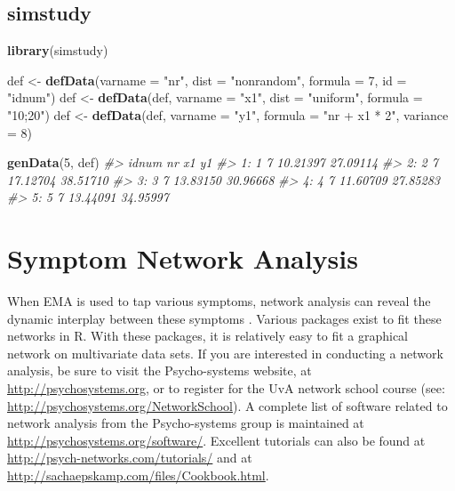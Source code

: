 \documentclass[]{book}
\newenvironment{Shaded}{\begin{snugshade}}{\end{snugshade}}
\newcommand{\KeywordTok}[1]{\textcolor[rgb]{0.13,0.29,0.53}{\textbf{#1}}}
\newcommand{\DataTypeTok}[1]{\textcolor[rgb]{0.13,0.29,0.53}{#1}}
\newcommand{\DecValTok}[1]{\textcolor[rgb]{0.00,0.00,0.81}{#1}}
\newcommand{\StringTok}[1]{\textcolor[rgb]{0.31,0.60,0.02}{#1}}
\newcommand{\CommentTok}[1]{\textcolor[rgb]{0.56,0.35,0.01}{\textit{#1}}}
\newcommand{\NormalTok}[1]{#1}
\begin{document}
\subsection{simstudy}\label{simstudy}

\begin{Shaded}
\begin{Highlighting}[]
\KeywordTok{library}\NormalTok{(simstudy)}

\NormalTok{def <-}\StringTok{ }\KeywordTok{defData}\NormalTok{(}\DataTypeTok{varname =} \StringTok{"nr"}\NormalTok{, }\DataTypeTok{dist =} \StringTok{"nonrandom"}\NormalTok{, }\DataTypeTok{formula =} \DecValTok{7}\NormalTok{, }\DataTypeTok{id =} \StringTok{"idnum"}\NormalTok{)}
\NormalTok{def <-}\StringTok{ }\KeywordTok{defData}\NormalTok{(def, }\DataTypeTok{varname =} \StringTok{"x1"}\NormalTok{, }\DataTypeTok{dist =} \StringTok{"uniform"}\NormalTok{, }\DataTypeTok{formula =} \StringTok{"10;20"}\NormalTok{)}
\NormalTok{def <-}\StringTok{ }\KeywordTok{defData}\NormalTok{(def, }\DataTypeTok{varname =} \StringTok{"y1"}\NormalTok{, }\DataTypeTok{formula =} \StringTok{"nr + x1 * 2"}\NormalTok{, }\DataTypeTok{variance =} \DecValTok{8}\NormalTok{)}

\KeywordTok{genData}\NormalTok{(}\DecValTok{5}\NormalTok{, def)}
\CommentTok{#>    idnum nr       x1       y1}
\CommentTok{#> 1:     1  7 10.21397 27.09114}
\CommentTok{#> 2:     2  7 17.12704 38.51710}
\CommentTok{#> 3:     3  7 13.83150 30.96668}
\CommentTok{#> 4:     4  7 11.60709 27.85283}
\CommentTok{#> 5:     5  7 13.44091 34.95997}
\end{Highlighting}
\end{Shaded}

\section{Symptom Network Analysis}\label{symptom-network-analysis}

 

When EMA is used to tap various symptoms, network analysis can reveal
the dynamic interplay between these symptoms
\citep{Borsboom2013, Borsboom2017, Bringmann2015}. Various packages
exist to fit these networks in R. With these packages, it is relatively
easy to fit a graphical network on multivariate data sets. If you are
interested in conducting a network analysis, be sure to visit the
Psycho-systems website, at \url{http://psychosystems.org}, or to
register for the UvA network school course (see:
\url{http://psychosystems.org/NetworkSchool}). A complete list of
software related to network analysis from the Psycho-systems group is
maintained at \url{http://psychosystems.org/software/}. Excellent
tutorials can also be found at
\url{http://psych-networks.com/tutorials/} and at
\url{http://sachaepskamp.com/files/Cookbook.html}.
\end{document}
